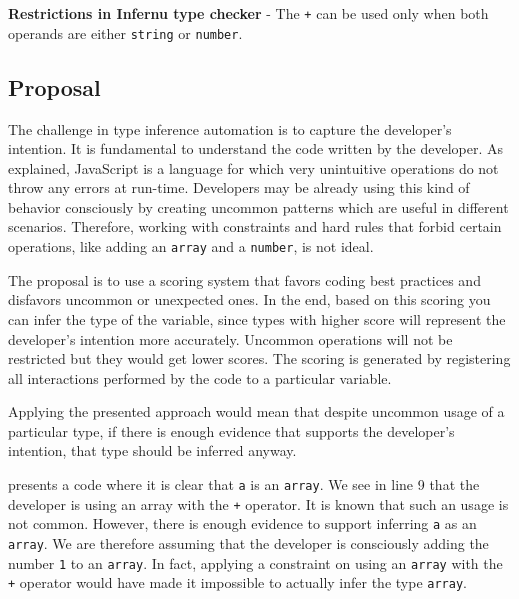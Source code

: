 \begin{code}
  \captionsetup{aboveskip=0pt, belowskip=10pt}
  \caption[Restrictions in Infernu type checker]{\textbf{Restrictions in Infernu type checker} - The \texttt{+} can be used only when both operands are either \texttt{string} or \texttt{number}.}
  \label{code:type-inference-constraints-infernu}
\end{code}


\subsection{Proposal}
The challenge in type inference automation is to capture the developer's intention. It is fundamental to understand the code written by the developer. As explained, JavaScript is a language for which very unintuitive operations do not throw any errors at run-time. Developers may be already using this kind of behavior consciously by creating uncommon patterns which are useful in different scenarios. Therefore, working with constraints and hard rules that forbid certain operations, like adding an \texttt{array} and a \texttt{number}, is not ideal.

The proposal is to use a scoring system that favors coding best practices and disfavors uncommon or unexpected ones. In the end, based on this scoring you can infer the type of the variable, since types with higher score will represent the developer's intention more accurately. Uncommon operations will not be restricted but they would get lower scores. The scoring is generated by registering all interactions performed by the code to a particular variable.

Applying the presented approach would mean that despite uncommon usage of a particular type, if there is enough evidence that supports the developer's intention, that type should be inferred anyway.

 presents a code where it is clear that \texttt{a} is an \texttt{array}. We see in line 9 that the developer is using an array with the \texttt{+} operator. It is known that such an usage is not common. However, there is enough evidence to support inferring \texttt{a} as an \texttt{array}. We are therefore assuming that the developer is consciously adding the number \texttt{1} to an \texttt{array}. In fact, applying a constraint on using an \texttt{array} with the \texttt{+} operator would have made it impossible to actually infer the type \texttt{array}.

